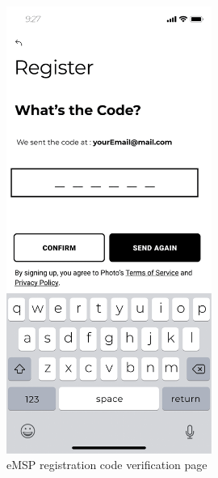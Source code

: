 \documentclass{Configuration_Files/PoliMi3i_thesis}
\begin{document}
\begin{figure}[H]
    \centering
    \includegraphics[width=0.6\textwidth]{Images/user-interface/emsp/eMSP (1)-02.png}
    \caption{eMSP registration code verification page}
\end{figure}
\end{document}

